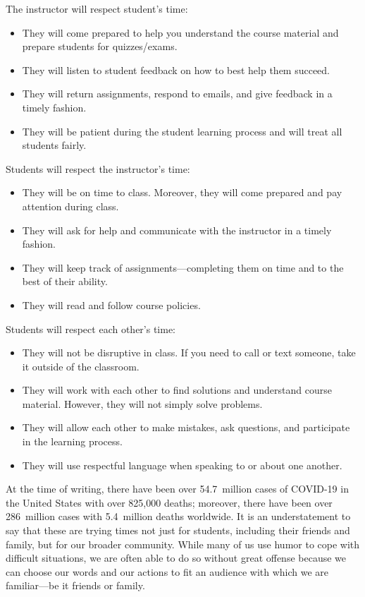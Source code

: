 \documentclass[11pt,letterpaper]{article}
\begin{document}
The instructor will respect student's time:
	\begin{itemize}
	\item They will come prepared to help you understand the course material and prepare students for quizzes/exams. 
	\item They will listen to student feedback on how to best help them succeed. 
	\item They will return assignments, respond to emails, and give feedback in a timely fashion. 
	\item They will be patient during the student learning process and will treat all students fairly. 
	\end{itemize} \pspace

Students will respect the instructor's time:
	\begin{itemize}
	\item They will be on time to class. Moreover, they will come prepared and pay attention during class. 
	\item They will ask for help and communicate with the instructor in a timely fashion. 
	\item They will keep track of assignments---completing them on time and to the best of their ability.  
	\item They will read and follow course policies. 
	\end{itemize} \pspace

Students will respect each other's time:
	\begin{itemize}
	\item They will not be disruptive in class. If you need to call or text someone, take it outside of the classroom. 
	\item They will work with each other to find solutions and understand course material. However, they will not simply solve problems. 
	\item They will allow each other to make mistakes, ask questions, and participate in the learning process. 
	\item They will use respectful language when speaking to or about one another. 
	\end{itemize}
\sectionbreak



At the time of writing, there have been over 54.7~million cases of COVID-19 in the United States with over 825,000 deaths; moreover, there have been over 286~million cases with 5.4~million deaths worldwide. It is an understatement to say that these are trying times not just for students, including their friends and family, but for our broader community. While many of us use humor to cope with difficult situations, we are often able to do so without great offense because we can choose our words and our actions to fit an audience with which we are familiar---be it friends or family. \pspace
\end{document}
